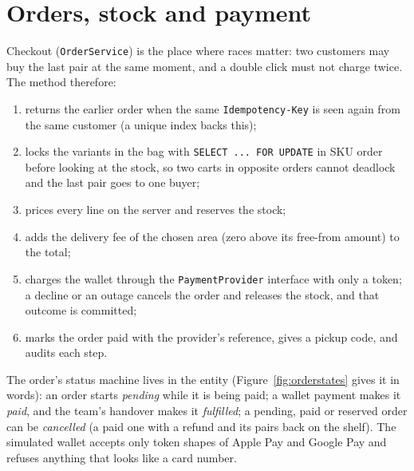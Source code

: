

\section{Orders, stock and payment}
\label{sec:orders}

Checkout (\texttt{OrderService}) is the place where races matter: two customers may buy the last pair at the same
moment, and a double click must not charge twice. The method therefore:
\begin{enumerate}
	\item returns the earlier order when the same \texttt{Idempotency-Key} is seen again from the same customer (a unique
	index backs this);
	\item locks the variants in the bag with \texttt{SELECT ... FOR UPDATE} in SKU order before looking at the stock, so
	two carts in opposite orders cannot deadlock and the last pair goes to one buyer;
	\item prices every line on the server and reserves the stock;
	\item adds the delivery fee of the chosen area (zero above its free-from amount) to the total;
	\item charges the wallet through the \texttt{PaymentProvider} interface with only a token; a decline or an outage
	cancels the order and releases the stock, and that outcome is committed;
	\item marks the order paid with the provider's reference, gives a pickup code, and audits each step.
\end{enumerate}

The order's status machine lives in the entity (Figure~\ref{fig:orderstates} gives it in words): an order starts
\emph{pending} while it is being paid; a wallet payment makes it \emph{paid}, and the team's handover makes it
\emph{fulfilled}; a pending, paid or reserved order can be \emph{cancelled} (a paid one with a refund and its pairs
back on the shelf). The simulated wallet accepts only token shapes of Apple Pay and Google Pay and refuses anything
that looks like a card number.

